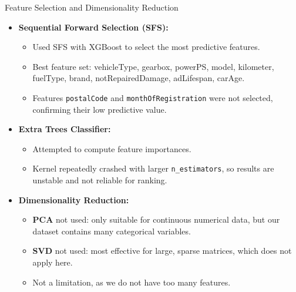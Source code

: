 \documentclass{beamer}
\begin{document}
\begin{frame}{Feature Selection and Dimensionality Reduction}
        \begin{itemize}
                \item \textbf{Sequential Forward Selection (SFS):}
                        \begin{itemize}
                                \item Used SFS with XGBoost to select the most
                                        predictive features.
                                \item Best feature set: vehicleType, gearbox,
                                        powerPS, model, kilometer, fuelType,
                                        brand, notRepairedDamage, adLifespan,
                                        carAge.
                                \item Features \texttt{postalCode} and
                                        \texttt{monthOfRegistration} were not
                                        selected, confirming their low
                                        predictive value.
                        \end{itemize}
                \item \textbf{Extra Trees Classifier:}
                        \begin{itemize}
                                \item Attempted to compute feature importances.
                                \item Kernel repeatedly crashed with larger
                                        \texttt{n\_estimators}, so results are
                                        unstable and not reliable for ranking.
                        \end{itemize}
                \item \textbf{Dimensionality Reduction:}
                        \begin{itemize}
                                \item \textbf{PCA} not used: only suitable for
                                        continuous numerical data, but our
                                        dataset contains many categorical
                                        variables.
                                \item \textbf{SVD} not used: most effective for
                                        large, sparse matrices, which does not
                                        apply here.
                                \item Not a limitation, as we do not have too
                                        many features.
                        \end{itemize}
        \end{itemize}
\end{frame}
\end{document}

